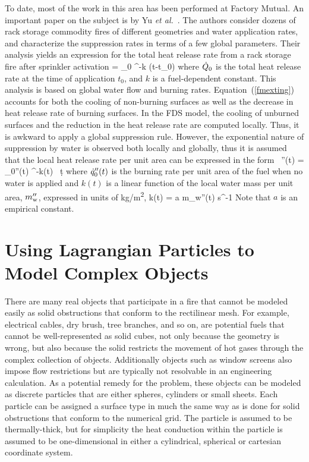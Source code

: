 To date, most of the work in this area has been performed at Factory Mutual. An important paper on the subject is by Yu {\em et al.}~\cite{Yu:1}. The authors consider dozens of rack storage commodity fires of different geometries and water application rates, and characterize the suppression rates in terms of a few global parameters. Their analysis yields an expression for the total heat release rate from a rack storage fire after sprinkler activation
\be 
   \dQ = \dQ_0 \; ^{-k (t-t_0)}  \label{fmexting}
\ee
where $\dot{Q}_0$ is the total heat release rate at the time of application $t_0$, and $k$ is a fuel-dependent constant. This analysis is based on global water flow and burning rates. Equation~(\ref{fmexting}) accounts for both the cooling of non-burning surfaces as well as the decrease in heat release rate of burning surfaces. In the FDS model, the cooling of unburned surfaces and the reduction in the heat release rate are computed locally. Thus, it is awkward to apply a global suppression rule. However, the exponential nature of suppression by water is observed both locally and globally, thus it is assumed that the local heat release rate per unit area can be expressed in the form~\cite{Hamins:1,Hamins:IAFSS2002}
\be 
   \dq''(t) = \dq_0''(t) \; ^{-\int k(t) \, \d t}
\label{nistexting} \ee
where $\dot{q}_0''(t)$ is the burning rate per unit area of the fuel when no water is applied and $k(t)$ is a linear function of the local water mass per unit area, $m_{\rm w}''$, expressed in units of \si{kg/m^2},
\be 
   k(t) = a \; m_{\rm w}''(t) \quad   \hbox{s}^{-1} 
\ee
Note that $a$ is an empirical constant.



\section{Using Lagrangian Particles to Model Complex Objects}

There are many real objects that participate in a fire that cannot be modeled easily as solid obstructions that conform
to the rectilinear mesh. For example, electrical cables, dry brush, tree branches, and so on, are potential fuels that cannot
be well-represented as solid cubes, not only because the geometry is wrong, but also because the solid restricts the
movement of hot gases through the complex collection of objects.  Additionally objects such as window screens also impose flow restrictions but are typically not resolvable in an engineering calculation. As a potential remedy for the problem, these objects can
be modeled as discrete particles that are either spheres, cylinders or small sheets. Each particle can be assigned a surface
type in much the same way as is done for solid obstructions that conform to the numerical grid. The particle is assumed to be
thermally-thick, but for simplicity the heat conduction within the particle is assumed to be one-dimensional in either
a cylindrical, spherical or cartesian coordinate system.

